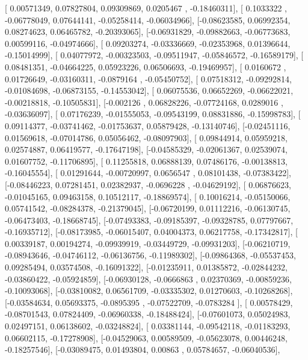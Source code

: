 \documentclass{article}
\begin{document}
       [ 0.00571349,  0.07827804,  0.09309869,  0.0205467 , -0.18460311],
       [ 0.1033322 , -0.06778049,  0.07644141, -0.05258414, -0.06034966],
       [-0.08623585,  0.06992354,  0.08274623,  0.06465782, -0.20393065],
       [-0.06931829, -0.09882663, -0.06773683,  0.00599116, -0.04974666],
       [ 0.09203274, -0.03336669, -0.02353968,  0.01396644, -0.15014999],
       [ 0.04077972, -0.00323503, -0.09511947, -0.05846572, -0.16589179],
       [ 0.08481351, -0.04664225,  0.05923226,  0.06506693, -0.19469957],
       [ 0.0160672 ,  0.01726649, -0.03160311, -0.0879164 , -0.05450752],
       [ 0.07518312, -0.09292814, -0.01084698, -0.06873155, -0.14553042],
       [ 0.06075536,  0.06652269, -0.06622021, -0.00218818, -0.10505831],
       [-0.002126  ,  0.06828226, -0.07724168,  0.0289016 , -0.03636097],
       [ 0.07176239, -0.01555053, -0.09543199,  0.08831886, -0.15998783],
       [ 0.09114377, -0.03741462, -0.01753637,  0.05879428, -0.13140746],
       [-0.02451116,  0.01569618, -0.07014786,  0.05056462, -0.08097903],
       [ 0.09844914,  0.05959218,  0.02574887,  0.06419577, -0.17647198],
       [-0.04585329, -0.02061367,  0.02539074,  0.01607752, -0.11706895],
       [ 0.11255818,  0.06888139,  0.07486176, -0.00138813, -0.16045554],
       [ 0.01291644, -0.00720997,  0.0656547 ,  0.08101438, -0.07383422],
       [-0.08446223,  0.07281451,  0.02382937, -0.0696228 , -0.04629192],
       [ 0.06876623, -0.01045165,  0.09463158,  0.10512117, -0.18869574],
       [ 0.10016214, -0.05150066,  0.05741542, -0.08284378, -0.21379045],
       [-0.06720199,  0.01112216, -0.06130745, -0.06473403, -0.18668745],
       [-0.07493383, -0.09185397, -0.09328785,  0.07797667, -0.16935712],
       [-0.08173985, -0.06015407,  0.04004373,  0.06217758, -0.17342817],
       [ 0.00339187,  0.00194274, -0.09939919, -0.03449729, -0.09931203],
       [-0.06210719, -0.08943646, -0.04746112, -0.06136756, -0.11989302],
       [-0.09864368, -0.05537453,  0.09285494,  0.03574508, -0.16091322],
       [-0.01235911,  0.01385872, -0.02844232, -0.03860422, -0.05924859],
       [-0.06930128, -0.0666863 ,  0.02370369, -0.00859236, -0.10093068],
       [-0.03810082,  0.06561709, -0.03335302,  0.01270603, -0.10268268],
       [-0.03584634,  0.05693375, -0.0895395 , -0.07522709, -0.0783284 ],
       [ 0.00578429, -0.08701543,  0.07824409, -0.06960338, -0.18488424],
       [-0.07601073,  0.05024983,  0.02497151,  0.06138602, -0.03248824],
       [ 0.03381144, -0.09542118, -0.01183293,  0.06602115, -0.17278908],
       [-0.04529063,  0.00589509, -0.05623078,  0.00446248, -0.18257546],
       [-0.03089475,  0.01493804,  0.00863   ,  0.05784657, -0.06040536],
\end{document}

